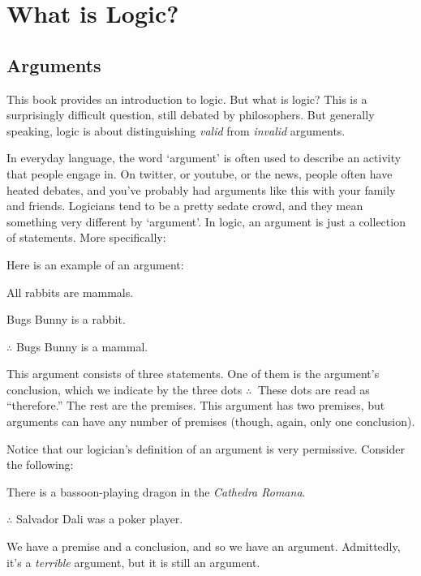 \chapter{What is Logic?}

\section{Arguments}\label{s:Arguments}


This book provides an introduction to logic.  But what is logic? This is a surprisingly difficult question, still debated by philosophers. But generally speaking, logic is about distinguishing \emph{valid} from \emph{invalid} arguments.

In everyday language, the word `argument' is often used to describe an activity that people engage in.   On twitter, or youtube, or the news, people often have heated debates, and you've probably had arguments like this with your family and friends.  Logicians tend to be a pretty sedate crowd, and they mean something very different by `argument'.  In logic, an argument is just a collection of statements.  More specifically:


\noindent Here is an example of an argument:

\begin{earg}
\item[\ex{exarg1}]All rabbits are mammals.
\item[] Bugs Bunny is a rabbit.
\item[] $\therefore$ Bugs Bunny is a mammal.
\end{earg}
This argument consists of three statements.  One of them is the argument's conclusion, which we indicate by the three dots $\therefore\ $  These dots are read as ``therefore.'' The rest are the premises.  This argument has two premises, but arguments can have any number of premises (though, again, only one conclusion).

Notice that our logician's definition of an argument is very permissive. Consider the following:
	\begin{earg}
		\item[] There is a bassoon-playing dragon in the \emph{Cathedra Romana}.
		\item[] $\therefore$ Salvador Dali was a poker player.
	\end{earg}
We have a premise and a conclusion, and so we have an argument. Admittedly, it's a \emph{terrible} argument, but it is still an argument.  

